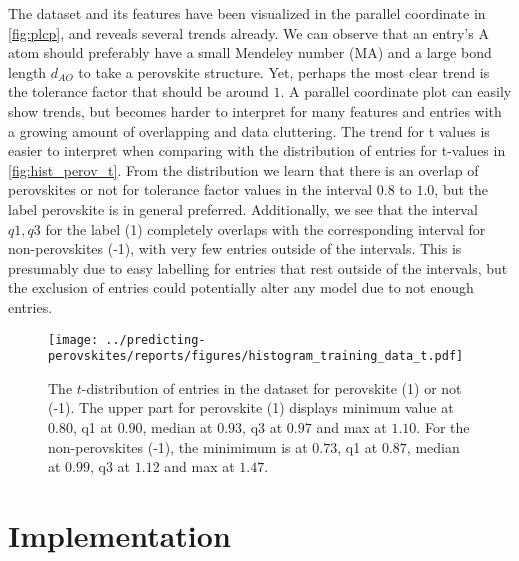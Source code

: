 \noindent The dataset and its features have been visualized in the parallel coordinate \cite{Inselberg1985} in \autoref{fig:plcp}, and reveals several trends already. We can observe that an entry's A atom should preferably have a small Mendeley number (MA) and a large bond length $d_{AO}$ to take a perovskite structure. Yet, perhaps the most clear trend is the tolerance factor that should be around $1$. A parallel coordinate plot can easily show trends, but becomes harder to interpret for many features and entries with a growing amount of overlapping and data cluttering. The trend for t values is easier to interpret when comparing with the distribution of entries for t-values in \autoref{fig:hist_perov_t}. From the distribution we learn that there is an overlap of perovskites or not for tolerance factor values in the interval $0.8$ to $1.0$, but the label perovskite is in general preferred. Additionally, we see that the interval ${q1,q3}$ for the label (1) completely overlaps with the corresponding interval for non-perovskites (-1), with very few entries outside of the intervals. This is presumably due to easy labelling for entries that rest outside of the intervals, but the exclusion of entries could potentially alter any model due to not enough entries. %

\begin{figure}[ht!]
  \centering
  \texttt{[image: ../predicting-perovskites/reports/figures/histogram\_training\_data\_t.pdf]}
  \vspace*{-130mm}
  \caption{The $t$-distribution of entries in the dataset for perovskite (1) or not (-1). The upper part for perovskite (1) displays minimum value at $0.80$, q1 at $0.90$, median at $0.93$, q3 at $0.97$ and max at $1.10$. For the non-perovskites (-1), the minimimum is at $0.73$, q1 at $0.87$, median at $0.99$, q3 at $1.12$ and max at $1.47$.}
  \label{fig:hist_perov_t}
\end{figure}

\section{Implementation}



